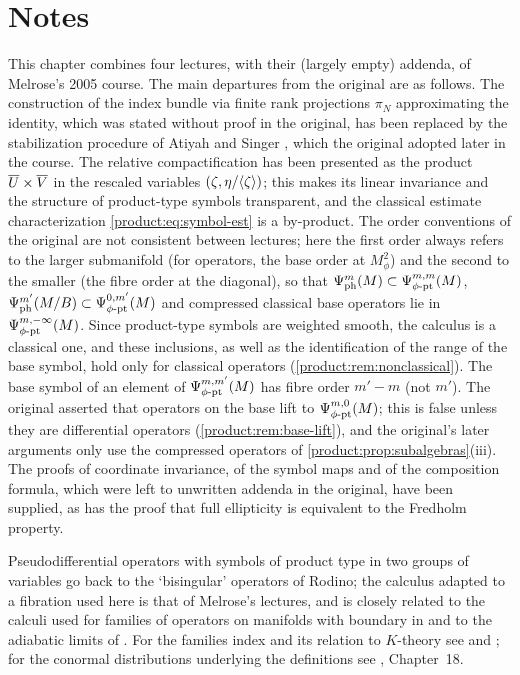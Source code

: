 \section*{Notes}
This chapter combines four lectures, with their (largely empty) addenda, of
Melrose's 2005 course. The main departures from the original are as follows.
The construction of the index bundle via finite rank projections $\pi_N$
approximating the identity, which was stated without proof in the original, has
been replaced by the stabilization procedure of Atiyah and Singer
\cite{Atiyah-Singer-IV}, which the original adopted later in the course. The
relative compactification has been presented as the product $\overline{U}\times\overline{V}$ in the
rescaled variables $(\zeta,\eta/\langle \zeta\rangle)$; this makes its linear invariance and
the structure of product-type symbols transparent, and the classical estimate
characterization \eqref{product:eq:symbol-est} is a by-product. The order
conventions of the original are not consistent between lectures; here the first
order always refers to the larger submanifold (for operators, the base order at
$M^2_\phi$) and the second to the smaller (the fibre order at the diagonal), so
that $\Psi^{m}_{\mathrm{ph}}(M)\subset\Psi^{m,m}_{\phi\text{-}\mathrm{pt}}(M)$,
$\Psi^{m'}_{\mathrm{ph}}(M/B)\subset\Psi^{0,m'}_{\phi\text{-}\mathrm{pt}}(M)$ and
compressed classical base operators lie in $\Psi^{m,-\infty}_{\phi\text{-}\mathrm{pt}}(M)$. Since
product-type symbols are weighted smooth, the calculus is a classical one, and
these inclusions, as well as the identification of the range of the base symbol,
hold only for classical operators (\cref{product:rem:nonclassical}). The base symbol of an
element of $\Psi^{m,m'}_{\phi\text{-}\mathrm{pt}}(M)$ has fibre order $m'-m$ (not $m'$). The original
asserted that operators on the base lift to $\Psi^{m,0}_{\phi\text{-}\mathrm{pt}}(M)$; this is false unless
they are differential operators (\cref{product:rem:base-lift}), and the original's
later arguments only use the compressed operators of
\cref{product:prop:subalgebras}(iii). The proofs of coordinate invariance,
of the symbol maps and of the composition formula, which were left to unwritten
addenda in the original, have been supplied, as has the proof that full
ellipticity is equivalent to the Fredholm property.

Pseudodifferential operators with symbols of product type in two groups of
variables go back to the `bisingular' operators of Rodino; the calculus adapted to
a fibration used here is that of Melrose's lectures, and is closely related to
the calculi used for families of operators on manifolds with boundary in
\cite{Melrose-Rochon} and to the adiabatic limits of \cite{Bismut-Cheeger}. For the
families index and its relation to $K$-theory see \cite{Atiyah-Singer-IV} and
\cite{Atiyah-K}; for the conormal distributions underlying the definitions see
\cite{Hormander-III}, Chapter~18.
